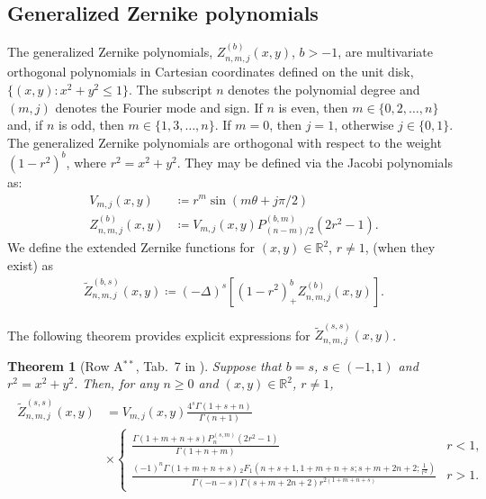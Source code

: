 \documentclass[10pt,a4paper]{article}
\newtheorem{theorem}{Theorem}[section]
\numberwithin{equation}{section}
\begin{document}
\subsection{Generalized Zernike polynomials}
\label{sec:zernike}
The generalized Zernike polynomials, $Z^{(b)}_{n,m,j}(x,y)$, $ b >-1$, are multivariate orthogonal polynomials in Cartesian coordinates defined on the unit disk, $\{(x,y) : x^2 + y^2 \leq 1\}$. The subscript $n$ denotes the polynomial degree and $(m,j)$ denotes the Fourier mode and sign. If $n$ is even, then $m \in \{0,2,\dots,n\}$ and, if $n$ is odd, then $m \in \{1,3,\dots,n\}$. If $m=0$, then $j=1$, otherwise $j \in \{0,1\}$. The generalized Zernike polynomials are orthogonal with respect to the weight $(1-r^2)^b$, where $r^2 = x^2 + y^2$. They may be defined via the Jacobi polynomials as:
\begin{align}
V_{m,j}(x,y) &\coloneqq r^m \sin(m\theta + j \pi/2)\\
Z^{(b)}_{n,m,j}(x,y) &\coloneqq V_{m, j}(x,y) P^{(b, m)}_{(n-m)/2}(2r^2-1).
\end{align}
We define the extended Zernike functions for $(x,y) \in \mathbb{R}^2$, $r \neq 1$, (when they exist) as
\begin{align}
\tilde{Z}^{(b,s)}_{n,m,j}(x,y) \coloneqq (-\Delta)^s [(1-r^2)^b_+ Z^{(b)}_{n,m,j}(x,y)].
\end{align}


The following theorem provides explicit expressions for $\tilde{Z}^{(s,s)}_{n,m,j}(x,y)$.
\begin{theorem}[Row A$^{**}$, Tab.~7 in \cite{Gutleb2023}]
Suppose that $b=s$, $s \in (-1,1)$ and $r^2 = x^2 + y^2$. Then, for any $n \geq 0$ and $(x,y) \in \mathbb{R}^2$, $r \neq 1$,
\begin{align}
\begin{split}
\tilde{Z}^{(s,s)}_{n,m,j}(x,y)
&=
V_{m,j}(x,y) \frac{4^s \Gamma(1 + s + n)}{\Gamma(n+1)} \\
&\times
\begin{cases} 
\frac{\Gamma \left(1+m+n+s\right) P_n^{(s,m)}(2r^2-1)}{\Gamma \left(1+n+m \right)} &r<1, \\ 
\frac{ (-1)^n \Gamma \left(1+m+n+s\right)  \, _2F_1\left(n+s+1,1+m+n+s;s+m+2 n+2;\frac{1}{r^2}\right)}{\Gamma (-n-s) \Gamma \left(s+m+2 n+2\right) r^{2(1+m+n+s)}} & r>1.
\end{cases}
\end{split}
\label{eq:extendedZernikedef}
\end{align}
\end{theorem}
\end{document}
